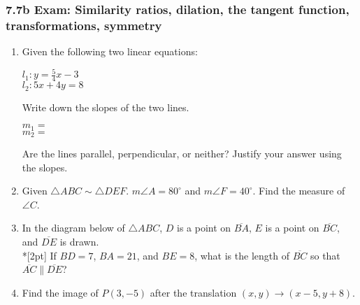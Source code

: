 \documentclass[12pt, twoside]{article}
\begin{document}
\subsubsection*{7.7b Exam: Similarity ratios, dilation, the tangent function, transformations, symmetry}
  \begin{enumerate}

\item Given the following two linear equations:
  \begin{multicols}{2}
    $l_1: y =\frac{5}{4}x-3$ \\
    $l_2: 5x+4y=8$
  \end{multicols}     \vspace{1cm}
  Write down the slopes of the two lines.
  \begin{multicols}{2}
    $m_1=$ \\
    $m_2=$
  \end{multicols}     \vspace{0.1cm}
  Are the lines parallel, perpendicular, or neither? Justify your answer using the slopes.
  \vspace{2cm}

\item Given $\triangle ABC \sim \triangle DEF$. $m\angle A = 80^\circ$ and $m\angle F = 40^\circ$. Find the measure of $\angle C$. \vspace{2cm}
  
\item In the diagram below of $\triangle ABC$, $D$ is a point on $\overline{BA}$, $E$ is a point on $\overline{BC}$, and $\overline{DE}$ is drawn. \\*[2pt] 
  If $BD=7$, $BA=21$, and $BE=8$, what is the length of $\overline{BC}$ so that $\overline{AC} \parallel \overline{DE}$?
  \begin{flushright}
    \end{flushright}

\item Find the image of $P(3,-5)$ after the translation $(x,y) \rightarrow (x-5,y+8)$.
  

\end{enumerate}
\end{document}
